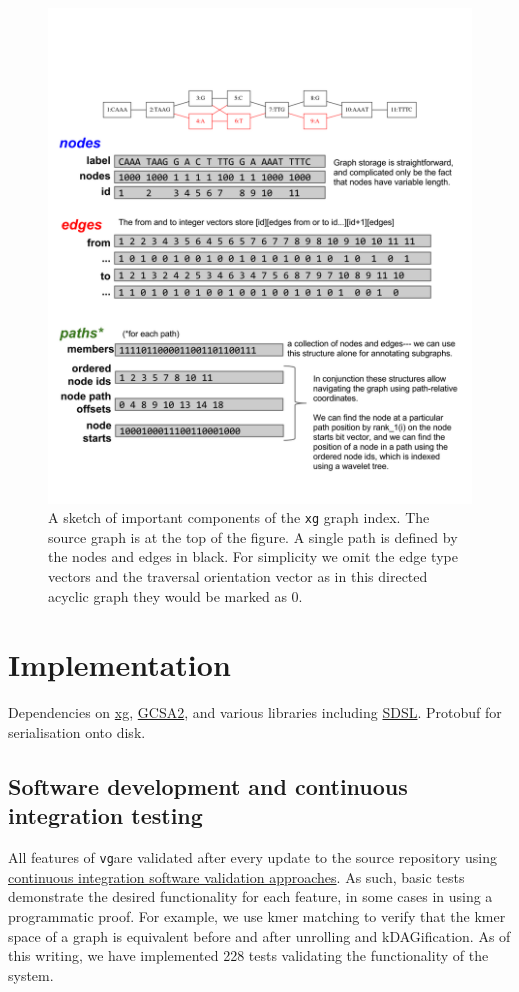 \documentclass[12pt]{article}
\newcommand{\vg}{{\tt vg}}
\begin{document}
\begin{figure}[t]
\centering
\includegraphics[width=1.0\textwidth]{figures/xg}
\caption{\label{fig:xg}
  A sketch of important components of the {\tt xg} graph index.
  The source graph is at the top of the figure.
  A single path is defined by the nodes and edges in black.
  For simplicity we omit the edge type vectors and the traversal orientation vector as in this directed acyclic graph they would be marked as 0.
}
\end{figure}

\section{Implementation}

Dependencies on \href{}{xg}, \href{}{GCSA2}, and various libraries including \href{}{SDSL}. 
Protobuf for serialisation onto disk.

\subsection{Software development and continuous integration testing}

All features of \vg are validated after every update to the source repository using \href{https://travis-ci.org/vgteam/vg}{continuous integration software validation approaches}.
As such, basic tests demonstrate the desired functionality for each feature, in some cases in using a programmatic proof.
For example, we use kmer matching to verify that the kmer space of a graph is equivalent before and after unrolling and kDAGification.
As of this writing, we have implemented 228 tests validating the functionality of the system.
\end{document}
